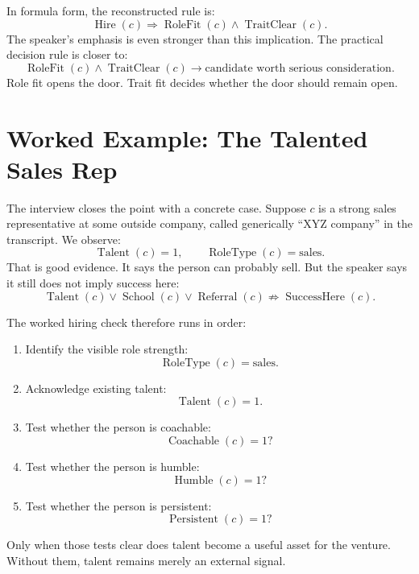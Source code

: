 In formula form, the reconstructed rule is:
\begin{equation}
  \operatorname{Hire}(c)
  \Rightarrow
  \operatorname{RoleFit}(c)
  \land
  \operatorname{TraitClear}(c).
\end{equation}
The speaker's emphasis is even stronger than this implication. The practical decision rule is closer to:
\begin{equation}
  \operatorname{RoleFit}(c)
  \land
  \operatorname{TraitClear}(c)
  \longrightarrow
  \text{candidate worth serious consideration}.
\end{equation}
Role fit opens the door. Trait fit decides whether the door should remain open.

\section{Worked Example: The Talented Sales Rep}

The interview closes the point with a concrete case. Suppose \(c\) is a strong sales representative at some outside company, called generically ``XYZ company'' in the transcript. We observe:
\begin{equation}
  \operatorname{Talent}(c)=1,
  \qquad
  \operatorname{RoleType}(c)=\text{sales}.
\end{equation}
That is good evidence. It says the person can probably sell. But the speaker says it still does not imply success here:
\begin{equation}
  \operatorname{Talent}(c)
  \lor
  \operatorname{School}(c)
  \lor
  \operatorname{Referral}(c)
  \nRightarrow
  \operatorname{SuccessHere}(c).
\end{equation}

The worked hiring check therefore runs in order:
\begin{enumerate}
  \item Identify the visible role strength:
  \[
    \operatorname{RoleType}(c)=\text{sales}.
  \]
  \item Acknowledge existing talent:
  \[
    \operatorname{Talent}(c)=1.
  \]
  \item Test whether the person is coachable:
  \[
    \operatorname{Coachable}(c)=1?
  \]
  \item Test whether the person is humble:
  \[
    \operatorname{Humble}(c)=1?
  \]
  \item Test whether the person is persistent:
  \[
    \operatorname{Persistent}(c)=1?
  \]
\end{enumerate}
Only when those tests clear does talent become a useful asset for the venture. Without them, talent remains merely an external signal.

